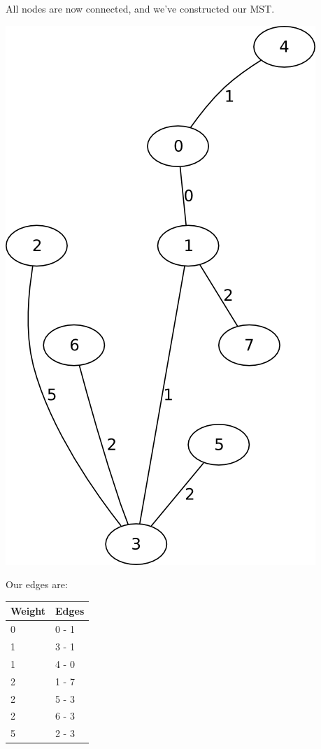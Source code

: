 \documentclass[12pt]{chmullighw}
\begin{document}
\begin{enumerate}
All nodes are now connected, and we've constructed our MST.

\begin{minipage}{0.7\linewidth}
\includegraphics[width=0.35\linewidth]{q6_mst.png}
\end{minipage}
\begin{minipage}{0.2\linewidth}
Our edges are: \\
\begin{tabular}{l | l}
Weight & Edges \\
\hline
0 & 0 - 1 \\
1 & 3 - 1 \\
1 & 4 - 0 \\
2 & 1 - 7 \\
2 & 5 - 3 \\
2 & 6 - 3 \\
5 & 2 - 3 \\
\end{tabular}
\end{minipage}


\end{enumerate} %
\end{document}
